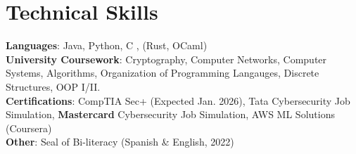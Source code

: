 \documentclass[letterpaper,11pt]{article}
\begin{document}
\section{Technical Skills}
  \begin{itemize}[leftmargin=0.15in, label={}]
    \small{\item{
      \textbf{Languages}{: Java, Python, C , (Rust, OCaml)} \\
      \textbf{University Coursework}{: Cryptography, Computer Networks, Computer Systems, Algorithms, Organization of Programming Langauges, Discrete Structures, OOP I/II.} \\
      \textbf{Certifications}{: CompTIA Sec+ (Expected Jan. 2026), Tata Cybersecurity Job Simulation, \textbf{Mastercard} Cybersecurity Job Simulation, AWS ML Solutions (Coursera)}\\
      \textbf{Other}{: Seal of Bi-literacy (Spanish \& English, 2022)}
    }}
  \end{itemize}

\end{document}
